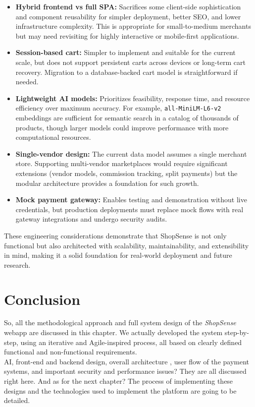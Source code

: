 \begin{itemize}
  \item \textbf{Hybrid frontend vs full SPA:} Sacrifices some client-side sophistication and component reusability for simpler deployment, better SEO, and lower infrastructure complexity. This is appropriate for small-to-medium merchants but may need revisiting for highly interactive or mobile-first applications.
  
  \item \textbf{Session-based cart:} Simpler to implement and suitable for the current scale, but does not support persistent carts across devices or long-term cart recovery. Migration to a database-backed cart model is straightforward if needed.
  
  \item \textbf{Lightweight AI models:} Prioritizes feasibility, response time, and resource efficiency over maximum accuracy. For example, \texttt{all-MiniLM-L6-v2} embeddings are sufficient for semantic search in a catalog of thousands of products, though larger models could improve performance with more computational resources.
  
  \item \textbf{Single-vendor design:} The current data model assumes a single merchant store. Supporting multi-vendor marketplaces would require significant extensions (vendor models, commission tracking, split payments) but the modular architecture provides a foundation for such growth.
  
  \item \textbf{Mock payment gateway:} Enables testing and demonstration without live credentials, but production deployments must replace mock flows with real gateway integrations and undergo security audits.
\end{itemize}

These engineering considerations demonstrate that ShopSense is not only functional but also architected with scalability, maintainability, and extensibility in mind, making it a solid foundation for real-world deployment and future research.

\section{Conclusion}
So, all the methodological approach and full system design of the \textit{ShopSense} webapp are discussed in this chapter. We actually developed the system step-by-step, using an iterative and Agile-inspired process, all based on clearly defined functional and non-functional requirements.\\
AI, front-end and backend design, overall architecture , user flow of the payment systems, and important security and performance issues? They are all discussed right here. And as for the next chapter? The process of implementing these designs and the technologies used to implement the platform are going to be detailed.

